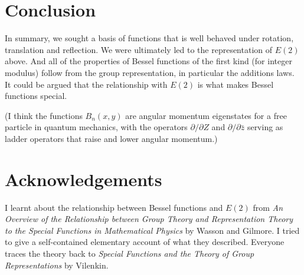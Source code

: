 \documentclass{article}
\begin{document}
\section{Conclusion}
In summary, we sought a basis of functions that is well behaved under rotation, translation and reflection.
We were ultimately led to the representation of $E(2)$ above.
And all of the properties of Bessel functions of the first kind (for integer modulus) follow from the group representation, in particular the additions laws.
It could be argued that the relationship with $E(2)$ is what makes Bessel functions special.

(I think the functions $B_n(x,y)$ are angular momentum eigenstates for a free particle in quantum mechanics, with the operators $\partial/\partial Z$ and $\partial/\partial\bar{z}$ serving as ladder operators that raise and lower angular momentum.)

\section{Acknowledgements}
I learnt about the relationship between Bessel functions and $E(2)$ from \textit{An Overview of the Relationship between Group Theory and Representation Theory to the Special Functions in Mathematical Physics} by Wasson and Gilmore.
I tried to give a self-contained elementary account of what they described.
Everyone traces the theory back to \textit{Special Functions and the Theory of Group Representations} by Vilenkin.
\end{document}
